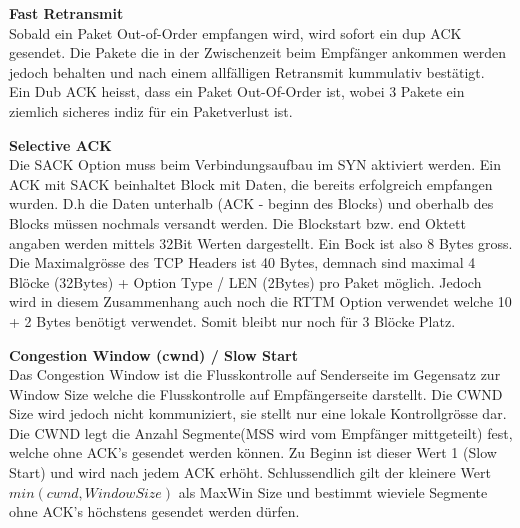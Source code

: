 \textbf{Fast Retransmit}\\
Sobald ein Paket Out-of-Order empfangen wird, wird sofort ein dup ACK gesendet. Die Pakete die in der Zwischenzeit beim Empfänger ankommen werden jedoch behalten und nach einem allfälligen Retransmit kummulativ bestätigt.\\
Ein Dub ACK heisst, dass ein Paket Out-Of-Order ist, wobei 3 Pakete ein ziemlich sicheres indiz für ein Paketverlust ist.

\textbf{Selective ACK}\\
Die SACK Option muss beim Verbindungsaufbau im SYN aktiviert werden. 
Ein ACK mit SACK beinhaltet Block mit Daten, die bereits erfolgreich empfangen wurden. D.h die Daten unterhalb (ACK - beginn des Blocks) und oberhalb des Blocks müssen nochmals versandt werden. Die Blockstart bzw. end Oktett angaben werden mittels 32Bit Werten dargestellt. Ein Bock ist also 8 Bytes gross.
Die Maximalgrösse des TCP Headers ist 40 Bytes, demnach sind maximal 4 Blöcke (32Bytes) + Option Type / LEN (2Bytes) pro Paket möglich. Jedoch wird in diesem Zusammenhang auch noch die RTTM Option verwendet welche 10 + 2 Bytes benötigt verwendet. Somit bleibt nur noch für 3 Blöcke Platz.

\textbf{Congestion Window (cwnd) / Slow Start}\\
Das Congestion Window ist die Flusskontrolle auf Senderseite im Gegensatz zur Window Size welche die Flusskontrolle auf Empfängerseite darstellt. Die CWND Size wird jedoch nicht kommuniziert, sie stellt nur eine lokale Kontrollgrösse dar. Die CWND legt die Anzahl Segmente(MSS wird vom Empfänger mittgeteilt) fest, welche ohne ACK's gesendet werden können. Zu Beginn ist dieser Wert 1 (Slow Start) und wird nach jedem ACK erhöht. Schlussendlich gilt der kleinere Wert $min(cwnd,WindowSize)$ als MaxWin Size und bestimmt wieviele Segmente ohne ACK's höchstens gesendet werden dürfen.


